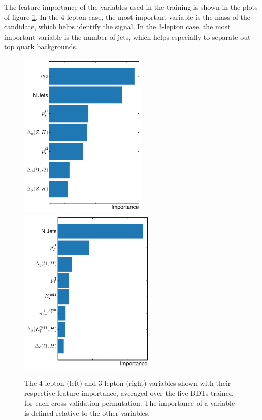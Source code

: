 

The feature importance of the variables used in the training is shown in the plots of figure \ref{fig:hmmVarImport}.
In the 4-lepton case, the most important variable is the mass of the \Z candidate, which helps identify the signal.
In the 3-lepton case, the most important variable is the number of jets, which helps especially to separate out top quark backgrounds.

\begin{figure}[htpb]
  \centering
  \includegraphics[height=8cm]{figures/hmm/bdtImportance/imp-4lep.pdf}
  \includegraphics[height=8cm]{figures/hmm/bdtImportance/imp-3lep.pdf}
  \caption{The 4-lepton (left) and 3-lepton (right) variables shown with their respective feature importance, averaged over the five BDTs trained for each cross-validation permutation. The importance of a variable is defined relative to the other variables.}
    \label{fig:hmmVarImport}
\end{figure}

